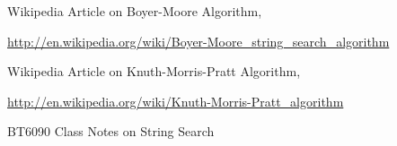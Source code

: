 \documentclass{article}
\begin{document}
\begin{thebibliography}{9}

  Wikipedia Article on Boyer-Moore Algorithm,
  
  \url{http://en.wikipedia.org/wiki/Boyer-Moore_string_search_algorithm}  
  
  Wikipedia Article on Knuth-Morris-Pratt Algorithm,
 
  \url{http://en.wikipedia.org/wiki/Knuth-Morris-Pratt_algorithm}  
  
  BT6090 Class Notes on String Search	
\end{thebibliography}




 
\end{document}
